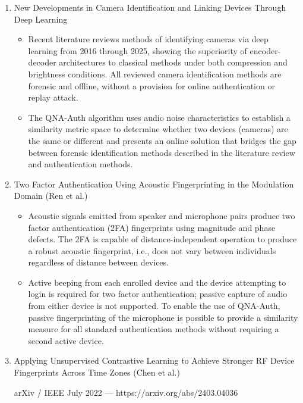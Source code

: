 \begin{enumerate}
\item New Developments in Camera Identification and Linking Devices Through Deep Learning

\begin{itemize}
\item Recent literature reviews methods of identifying cameras via deep learning from 2016 through 2025, showing the superiority of encoder-decoder architectures to classical methods under both compression and brightness conditions. All reviewed camera identification methods are forensic and offline, without a provision for online authentication or replay attack.
\item The QNA-Auth algorithm uses audio noise characteristics to establish a similarity metric space to determine whether two devices (cameras) are the same or different and presents an online solution that bridges the gap between forensic identification methods described in the literature review and authentication methods.
\end{itemize}

\item Two Factor Authentication Using Acoustic Fingerprinting in the Modulation Domain (Ren et al.)

\begin{itemize}
\item Acoustic signals emitted from speaker and microphone pairs produce two factor authentication (2FA) fingerprints using magnitude and phase defects. The 2FA is capable of distance-independent operation to produce a robust acoustic fingerprint, i.e., does not vary between individuals regardless of distance between devices.
\item Active beeping from each enrolled device and the device attempting to login is required for two factor authentication; passive capture of audio from either device is not supported. To enable the use of QNA-Auth, passive fingerprinting of the microphone is possible to provide a similarity measure for all standard authentication methods without requiring a second active device.
\end{itemize}

\item Applying Unsupervised Contrastive Learning to Achieve Stronger RF Device Fingerprints Across Time Zones (Chen et al.)

arXiv / IEEE July 2022 — https://arxiv.org/abs/2403.04036


\end{enumerate}
